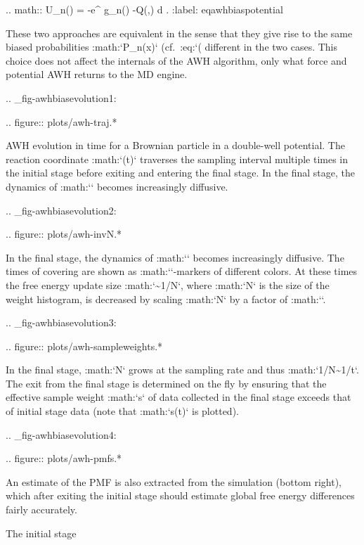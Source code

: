 .. math:: U_n(\xi) = -\ln \int e^{ g_n(\lambda) -Q(\xi,\lambda)} d \lambda.
          :label: eqawhbiaspotential

These two approaches are equivalent in the sense that they give rise to
the same biased probabilities :math:`P_n(x)`
(cf. :eq:`(%
different in the two cases. This choice does not affect the internals of
the AWH algorithm, only what force and potential AWH returns to the MD
engine.

.. _fig-awhbiasevolution1:

.. figure:: plots/awh-traj.*

        AWH evolution in time for a Brownian particle in a double-well
        potential. The reaction coordinate :math:`\xi(t)` traverses the sampling
        interval multiple times in the initial stage before exiting and entering
        the final stage. In the final stage, the dynamics of
        :math:`\xi` becomes increasingly diffusive.

.. _fig-awhbiasevolution2:

.. figure:: plots/awh-invN.*

        In the final stage, the dynamics of
        :math:`\xi` becomes increasingly diffusive. The times of covering are
        shown as :math:`\times`-markers of different colors. At these times the
        free energy update size :math:`\sim 1/N`, where :math:`N` is the size of
        the weight histogram, is decreased by scaling :math:`N` by a factor of
        :math:``.

.. _fig-awhbiasevolution3:

.. figure:: plots/awh-sampleweights.*

        In the final stage, :math:`N` grows at the
        sampling rate and thus :math:`1/N\sim1/t`. The exit from the final stage
        is determined on the fly by ensuring that the effective sample weight
        :math:`s` of data collected in the final stage exceeds that of initial
        stage data (note that :math:`\ln s(t)` is plotted).

.. _fig-awhbiasevolution4:

.. figure:: plots/awh-pmfs.*

        An estimate of the PMF is also extracted from the simulation (bottom
        right), which after exiting the initial stage should estimate global
        free energy differences fairly accurately.

The initial stage
~~~~~~~~~~~~~~~~~

